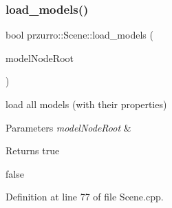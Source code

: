 \subsubsection{\texorpdfstring{load\_models()}{load\_models()}}
{\footnotesize\ttfamily bool przurro\+::\+Scene\+::load\+\_\+models (\begin{DoxyParamCaption}\item[{X\+M\+L\+\_\+\+Node $\ast$}]{model\+Node\+Root }\end{DoxyParamCaption})}



load all models (with their properties) 


\begin{DoxyParams}{Parameters}
{\em model\+Node\+Root} & \\
\hline
\end{DoxyParams}
\begin{DoxyReturn}{Returns}
true 

false 
\end{DoxyReturn}


Definition at line 77 of file Scene.\+cpp.


